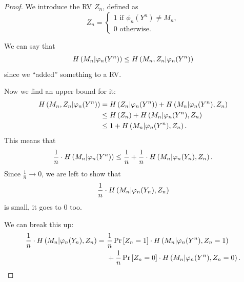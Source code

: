 \begin{proof}
	We introduce the \ac{RV} $Z_n$, defined as
	\begin{equation*}
		Z_n =
			\begin{cases}
				1 \text{ if } \phi_n(Y^n) \neq M_n,\\
				0 \text{ otherwise.}
			\end{cases} 
	\end{equation*}

	We can say that
	\begin{equation*}
		H\left({M_n | \varphi_n(Y^n)}\right) \le
		H\left({M_n, Z_n | \varphi_n(Y^n)}\right)
	\end{equation*}
	since we ``added'' something to a \ac{RV}.

	Now we find an upper bound for it:
	\begin{align*}
		H\left({M_n, Z_n | \varphi_n(Y^n)}\right)
		& =
		H\left({Z_n | \varphi_n(Y^n)}\right) +
		H\left({M_n | \varphi_n(Y^n), Z_n}\right)
		\\
		& \le
		H\left({Z_n}\right) +
		H\left({M_n | \varphi_n(Y^n), Z_n}\right)
		\\
		& \le
		1 +
		H\left({M_n | \varphi_n(Y^n), Z_n}\right).
	\end{align*}
	This means that
	\begin{equation*}
		\frac{1}{n} \cdot H\left({M_n | \varphi_n(Y^n)}\right) \le
		\frac{1}{n} + \frac{1}{n} \cdot H\left({M_n | \varphi_n(Y_n), Z_n}\right).
	\end{equation*}
	Since $\frac{1}{n} \to 0$, we are left to show that
	\begin{equation*}
		\frac{1}{n} \cdot H\left({M_n | \varphi_n(Y_n), Z_n}\right)
	\end{equation*}
	is small, \ie it goes to $0$ too.

	We can break this up:
	\begin{equation} \label{eq:eqbreak}
	\begin{aligned}
		\frac{1}{n} \cdot H\left({M_n | \varphi_n(Y_n), Z_n}\right)
		= &~
		\frac{1}{n}\mathop{\mathrm{Pr}}\limits_{} \left[ {Z_n = 1} \right] \cdot H\left({M_n | \varphi_n(Y^n), Z_n = 1}\right)
		\\
		&~+
		\frac{1}{n}\mathop{\mathrm{Pr}}\limits_{} \left[ {Z_n = 0} \right] \cdot H\left({M_n | \varphi_n(Y^n), Z_n = 0}\right).  
	\end{aligned}
	\end{equation}


\end{proof}
